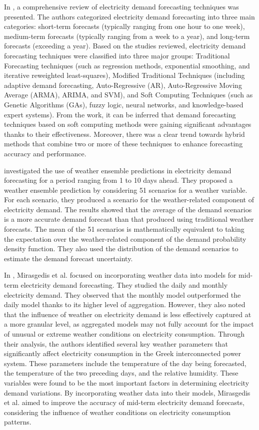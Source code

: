 In \cite{singh2013overview}, a comprehensive review of electricity demand forecasting techniques was presented.
The authors categorized electricity demand forecasting into three main categories:
short-term forecasts (typically ranging from one hour to one week),
medium-term forecasts (typically ranging from a week to a year),
and long-term forecasts (exceeding a year).
Based on the studies reviewed, electricity demand forecasting techniques were classified into three major groups:
Traditional Forecasting techniques (such as regression methods, exponential smoothing, and iterative reweighted least-squares),
Modified Traditional Techniques (including adaptive demand forecasting, Auto-Regressive (AR), Auto-Regressive Moving Average (ARMA), ARIMA, and SVM),
and Soft Computing Techniques (such as Genetic Algorithms (GAs), fuzzy logic, neural networks, and knowledge-based expert systems).
From the work, it can be inferred that demand forecasting techniques based on soft computing methods were gaining significant advantages thanks to their effectiveness.
Moreover, there was a clear trend towards hybrid methods that combine two or more of these techniques to enhance forecasting accuracy and performance.

\cite{TAYLOR200357} investigated the use of weather ensemble predictions in electricity demand forecasting for a period ranging from 1 to 10 days ahead.
They proposed a weather ensemble prediction by considering 51 scenarios for a weather variable.
For each scenario, they produced a scenario for the weather-related component of electricity demand.
The results showed that the average of the demand scenarios is a more accurate demand forecast than that produced using traditional weather forecasts.
The mean of the 51 scenarios is mathematically equivalent to taking the expectation over the weather-related component of the demand probability density function.
They also used the distribution of the demand scenarios to estimate the demand forecast uncertainty.

In \cite{MIRASGEDIS2006208}, Mirasgedis et al. focused on incorporating weather data into models for mid-term electricity demand forecasting.
They studied the daily and monthly electricity demand.
They observed that the monthly model outperformed the daily model thanks to its higher level of aggregation.
However, they also noted that the influence of weather on electricity demand is less effectively captured at a more granular level, as aggregated models may not fully account for the impact of unusual or extreme weather conditions on electricity consumption.
Through their analysis, the authors identified several key weather parameters that significantly affect electricity consumption in the Greek interconnected power system.
These parameters include the temperature of the day being forecasted, the temperature of the two preceding days, and the relative humidity.
These variables were found to be the most important factors in determining electricity demand variations.
By incorporating weather data into their models, Mirasgedis et al. aimed to improve the accuracy of mid-term electricity demand forecasts, considering the influence of weather conditions on electricity consumption patterns.

